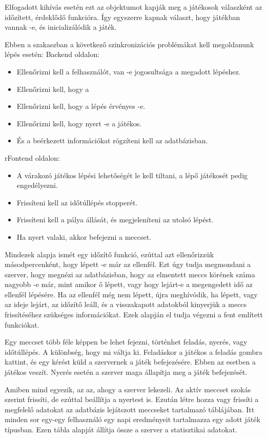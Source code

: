 Elfogadott kihívás esetén ezt az objektumot kapják meg a játékosok válaszként az időzített, érdeklődő funkcióra. Így egyszerre kapnak választ, hogy játékban vannak -e, és inicializálódik a játék.

Ebben a szakaszban a következő szinkronizációs problémákat kell megoldanunk lépés esetén:
Backend oldalon:
\begin{itemize}
	\item Ellenőrizni kell a felhasználót, van -e jogosultsága a megadott lépéshez.
	\item Ellenőrizni kell, hogy a
	\item Ellenőrizni kell, hogy a lépés érvényes -e.
	\item Ellenőrizni kell, hogy nyert -e a játékos.
	\item És a beérkezett információkat rögzíteni kell az adatbázisban.
\end{itemize}

rFontend oldalon:
\begin{itemize}
	\item A várakozó játékos lépési lehetőségét le kell tiltani, a lépő játékosét pedig engedélyezni.
	\item Frissíteni kell az időtúllépés stopperét.
	\item Frissíteni kell a pálya állását, és megjeleníteni az utolsó lépést.
	\item Ha nyert valaki, akkor befejezni a meccset.
\end{itemize}

Mindezek alapja ismét egy időzítő funkció, ezúttal azt ellenőrizzük másodpercenként, hogy lépett -e már az ellenfél. Ezt úgy tudja megmondani a szerver, hogy megnézi az adatbázisban, hogy az elmentett meccs körének száma nagyobb -e már, mint amikor ő lépett, vagy hogy lejárt-e a megengedett idő az ellenfél lépésére. Ha az ellenfél még nem lépett, újra meghívódik, ha lépett, vagy az ideje lejárt, az időzítő leáll, és a visszakapott adatokból kinyerjük a meccs frissítéséhez szükséges információkat. Ezek alapján el tudja végezni a fent említett funkciókat.

Egy meccset több féle képpen be lehet fejezni, történhet feladás, nyerés, vagy időtúllépés. A különbség, hogy mi váltja ki. Feladáskor a játékos a feladás gombra kattint, és egy kérést küld a szervernek a játék befejezésére. Ebben az esetben a játékos veszít. Nyerés esetén a szerver maga állapítja meg a játék befejezését.

Amiben mind egyezik, az az, ahogy a szerver lekezeli. Az aktív meccset szokás szerint frissíti, de ezúttal beállítja a nyertest is. Ezután létre hozza vagy frissíti a megfelelő adatokat az adatbázis lejátszott meccseket tartalmazó táblájában. Itt minden sor egy-egy felhasználó egy napi eredményeit tartalmazza egy adott játék típusban. Ezen tábla alapját állítja össze a szerver a statisztikai adatokat.

